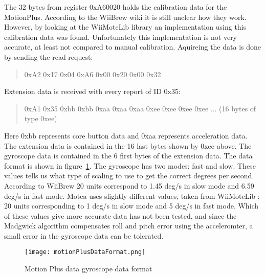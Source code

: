 The 32 bytes from register 0xA60020 holds the calibration data for the MotionPlus. According to the WiiBrew wiki \cite{wiiBrew} it is still unclear how they work. However, by looking at the WiiMoteLib \cite{wiiMoteLib} library an implementation using this calibration data was found. Unfortunately this implementation is not very accurate, at least not compared to manual calibration. Aquireing the data is done by sending the read request:
\begin{quote}
0xA2 0x17 0x04 0xA6 0x00 0x20 0x00 0x32
\end{quote}

Extension data is received with every report of ID 0x35:
\begin{quote}
0xA1 0x35 0xbb 0xbb 0xaa 0xaa 0xaa 0xee 0xee 0xee 0xee ... (16 bytes of type 0xee)
\end{quote}
Here 0xbb represents core button data and 0xaa represents acceleration data. The extension data is contained in the 16 last bytes shown by 0xee above. The gyroscope data is contained in the 6 first bytes of the extension data. The data format is shown in figure~\ref{fig:motionPlusDataFormat}. The gyroscope has two modes: fast and slow. These values tells us what type of scaling to use to get the correct degrees per second. According to WiiBrew \cite{wiiBrew} 20 units correspond to 1.45 deg/s in slow mode and 6.59 deg/s in fast mode. Motea uses slightly different values, taken from WiiMoteLib \cite{wiiMoteLib}: 20 units corresponding to 1 deg/s in slow mode and 5 deg/s in fast mode. Which of these values give more accurate data has not been tested, and since the Madgwick algorithm \cite{madgwick} compensates roll and pitch error using the acceleromter, a small error in the gyroscope data can be tolerated. 
\begin{figure}[h!]
  \centering
    \texttt{[image: motionPlusDataFormat.png]}
    \caption{\footnotesize Motion Plus data gyroscope data format}
    \label{fig:motionPlusDataFormat}
\end{figure}

